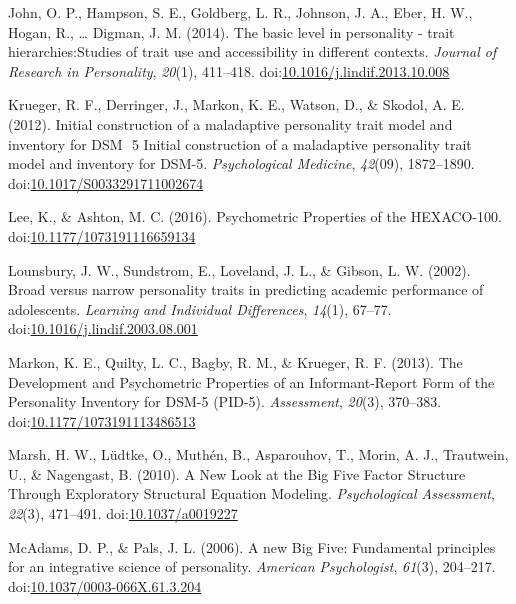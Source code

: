 \documentclass[man]{apa6}
\theoremstyle{definition}
\theoremstyle{definition}
\theoremstyle{definition}
\theoremstyle{remark}
\begin{document}
\leavevmode\hypertarget{ref-Ziegler2014}{}%
John, O. P., Hampson, S. E., Goldberg, L. R., Johnson, J. A., Eber, H.
W., Hogan, R., \ldots{} Digman, J. M. (2014). The basic level in
personality - trait hierarchies:Studies of trait use and accessibility
in different contexts. \emph{Journal of Research in Personality},
\emph{20}(1), 411--418.
doi:\href{https://doi.org/10.1016/j.lindif.2013.10.008}{10.1016/j.lindif.2013.10.008}

\leavevmode\hypertarget{ref-Krueger2012a}{}%
Krueger, R. F., Derringer, J., Markon, K. E., Watson, D., \& Skodol, A.
E. (2012). Initial construction of a maladaptive personality trait model
and inventory for DSM ­ 5 Initial construction of a maladaptive
personality trait model and inventory for DSM-5. \emph{Psychological
Medicine}, \emph{42}(09), 1872--1890.
doi:\href{https://doi.org/10.1017/S0033291711002674}{10.1017/S0033291711002674}

\leavevmode\hypertarget{ref-Lee2016}{}%
Lee, K., \& Ashton, M. C. (2016). Psychometric Properties of the
HEXACO-100.
doi:\href{https://doi.org/10.1177/1073191116659134}{10.1177/1073191116659134}

\leavevmode\hypertarget{ref-Lounsbury2002}{}%
Lounsbury, J. W., Sundstrom, E., Loveland, J. L., \& Gibson, L. W.
(2002). Broad versus narrow personality traits in predicting academic
performance of adolescents. \emph{Learning and Individual Differences},
\emph{14}(1), 67--77.
doi:\href{https://doi.org/10.1016/j.lindif.2003.08.001}{10.1016/j.lindif.2003.08.001}

\leavevmode\hypertarget{ref-Markon2013}{}%
Markon, K. E., Quilty, L. C., Bagby, R. M., \& Krueger, R. F. (2013).
The Development and Psychometric Properties of an Informant-Report Form
of the Personality Inventory for DSM-5 (PID-5). \emph{Assessment},
\emph{20}(3), 370--383.
doi:\href{https://doi.org/10.1177/1073191113486513}{10.1177/1073191113486513}

\leavevmode\hypertarget{ref-Marsh2010}{}%
Marsh, H. W., Lüdtke, O., Muthén, B., Asparouhov, T., Morin, A. J.,
Trautwein, U., \& Nagengast, B. (2010). A New Look at the Big Five
Factor Structure Through Exploratory Structural Equation Modeling.
\emph{Psychological Assessment}, \emph{22}(3), 471--491.
doi:\href{https://doi.org/10.1037/a0019227}{10.1037/a0019227}

\leavevmode\hypertarget{ref-McAdams2006a}{}%
McAdams, D. P., \& Pals, J. L. (2006). A new Big Five: Fundamental
principles for an integrative science of personality. \emph{American
Psychologist}, \emph{61}(3), 204--217.
doi:\href{https://doi.org/10.1037/0003-066X.61.3.204}{10.1037/0003-066X.61.3.204}
\end{document}
